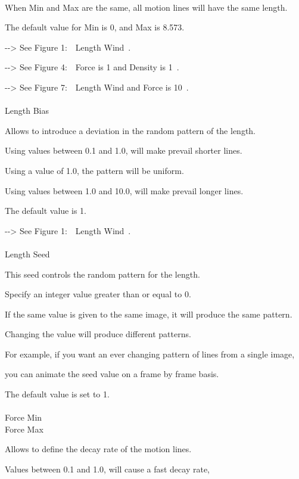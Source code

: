 \documentclass[a4paper,12pt]{article}
\begin{document}
\newpage

\thispagestyle{empty}

\ \vspace{-0.2em}
\par
When Min and Max are the same, all motion lines will have the same length.\par
The default value for Min is 0, and Max is 8.573.\par
-{-}> See \textquotedbl Figure 1:\ \ Length Wind\textquotedbl \ .\par
-{-}> See \textquotedbl Figure 4:\ \ Force is 1 and Density is 1\textquotedbl \ .\par
-{-}> See \textquotedbl Figure 7:\ \ Length Wind and Force is 10\textquotedbl \ .\\
\\
Length Bias\par
Allows to introduce a deviation in the random pattern of the length.\par
Using values between 0.1 and 1.0, will make prevail shorter lines.\par
Using a value of 1.0, the pattern will be uniform.\par
Using values between 1.0 and 10.0, will make prevail longer lines.\par
The default value is 1.\par
-{-}> See \textquotedbl Figure 1:\ \ Length Wind\textquotedbl \ .\\
\\
Length Seed\par
This seed controls the random pattern for the length.\par
Specify an integer value greater than or equal to 0.\par
If the same value is given to the same image, it will produce the same pattern.\par
Changing the value will produce different patterns.\par
For example, if you want an ever changing pattern of lines from a single image,\par
you can animate the seed value on a frame by frame basis.\par
The default value is set to 1.\\
\\
Force Min\\
Force Max\par
Allows to define the decay rate of the motion lines.\par
Values between 0.1 and 1.0, will cause a fast decay rate,\par
\end{document}
